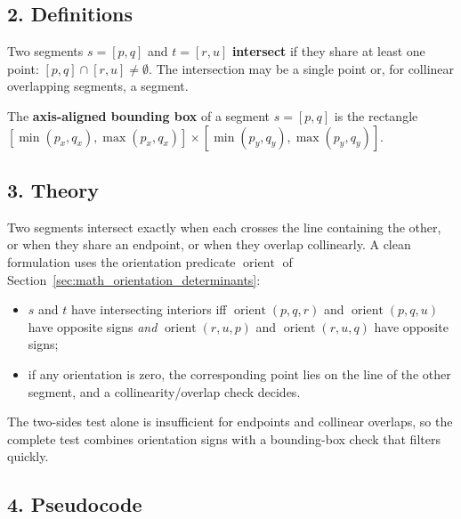 \subsection{2. Definitions}

\begin{definition}\label{def:segint_intersection}
  Two segments $s = [p,q]$ and $t = [r,u]$ \textbf{intersect} if they share
  at least one point: $[p,q] \cap [r,u] \neq \emptyset$. The intersection
  may be a single point or, for collinear overlapping segments, a segment.
\end{definition}

\begin{definition}\label{def:segint_bbox}
  The \textbf{axis-aligned bounding box} of a segment $s=[p,q]$ is the
  rectangle $[\min(p_x,q_x), \max(p_x,q_x)] \times [\min(p_y,q_y),
  \max(p_y,q_y)]$.
\end{definition}

\subsection{3. Theory}

Two segments intersect exactly when each crosses the line containing the
other, or when they share an endpoint, or when they overlap collinearly. A
clean formulation uses the orientation predicate $\operatorname{orient}$
of Section~\ref{sec:math_orientation_determinants}:
\begin{itemize}
  \item $s$ and $t$ have intersecting interiors iff
    $\operatorname{orient}(p,q,r)$ and $\operatorname{orient}(p,q,u)$ have
    opposite signs \emph{and} $\operatorname{orient}(r,u,p)$ and
    $\operatorname{orient}(r,u,q)$ have opposite signs;
  \item if any orientation is zero, the corresponding point lies on the
    line of the other segment, and a collinearity/overlap check decides.
\end{itemize}
The two-sides test alone is insufficient for endpoints and collinear
overlaps, so the complete test combines orientation signs with a bounding-box
check that filters quickly.

\subsection{4. Pseudocode}

